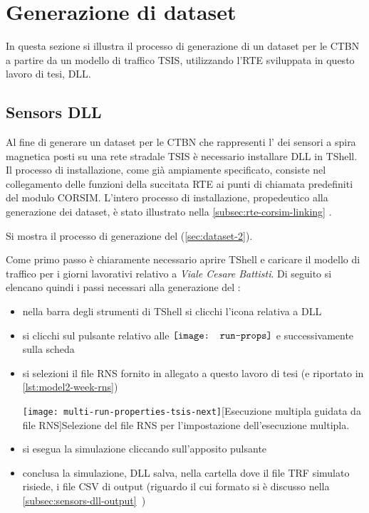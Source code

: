 \section{Generazione di dataset}\label{sec:create-dataset-howto}
In questa sezione si illustra il processo di generazione di un dataset per le \acs{CTBN} a partire da un modello di traffico \acs{TSIS}, utilizzando l'\acl{RTE} sviluppata in questo lavoro di tesi,  \acs{DLL}.

\subsection{Sensors DLL}
Al fine di generare un dataset per le \acs{CTBN} che rappresenti l' dei sensori a spira magnetica posti su una rete stradale \acs{TSIS} è necessario installare  \acs{DLL} in \acs{TShell}. Il processo di installazione, come già ampiamente specificato, consiste nel collegamento delle funzioni della succitata \acs{RTE} ai punti di chiamata predefiniti del modulo \acs{CORSIM}. L'intero processo di installazione, propedeutico alla generazione dei dataset, è stato illustrato nella \autoref{subsec:rte-corsim-linking} .

Si mostra il processo di generazione del  (\vref{sec:dataset-2}).

Come primo passo è chiaramente necessario aprire \acs{TShell} e caricare il modello di traffico per i giorni lavorativi relativo a \emph{Viale Cesare Battisti}. Di seguito si elencano quindi i passi necessari alla generazione del :
\begin{itemize}
	\item nella barra degli strumenti di \acs{TShell} si clicchi l'icona relativa a  \acs{DLL}
	\item si clicchi sul pulsante relativo alle \emph{} $\vcenter{\hbox{\texttt{[image: run-props]}}}$ e successivamente sulla scheda \emph{}
	\item si selezioni il file \acs{RNS} fornito in allegato a questo lavoro di tesi (e riportato in \vref{lst:model2-week-rns})\par
	\begin{minipage}{\linewidth}
		\centering
		\texttt{[image: multi-run-properties-tsis-next]}[Esecuzione multipla guidata da file \acs{RNS}]{Selezione del file \acs{RNS} per l'impostazione dell'esecuzione multipla.}\label{fig:multi-run-properties-tsis-next}
	\end{minipage}
	\item si esegua la simulazione cliccando sull'apposito pulsante
	\item conclusa la simulazione,  \acs{DLL} salva, nella cartella dove il file \acs{TRF} simulato risiede, i file \acs{CSV} di output (riguardo il cui formato si è discusso nella \autoref{subsec:sensors-dll-output}~)
\end{itemize}

